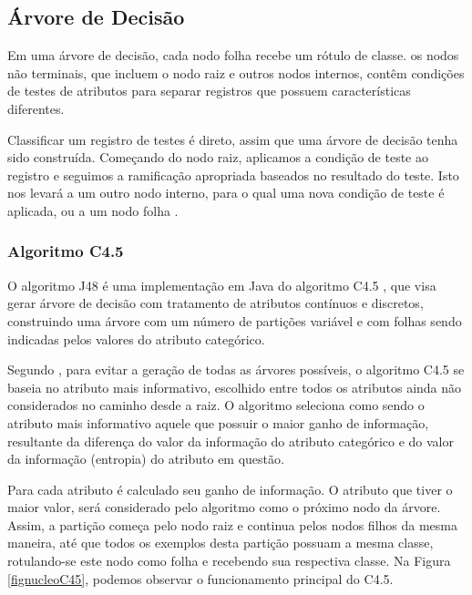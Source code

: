 \documentclass[
	12pt,				%
	openright,			%
	oneside,	
	a4paper,				%
	english,				%
	brazil				%
]{abntex2/abntex2} %
\begin{document}
	\subsection{Árvore de Decisão}
	
		Em uma árvore de decisão, cada nodo folha recebe um rótulo de classe. os nodos não terminais, que incluem o nodo raiz e outros nodos internos, contêm condições de testes de atributos para separar registros que possuem características diferentes.
		
		Classificar um registro de testes é direto, assim que uma árvore de decisão tenha sido construída. Começando do nodo raiz, aplicamos a condição de teste ao registro e seguimos a ramificação apropriada baseados no resultado do teste. Isto nos levará a um outro nodo interno, para o qual uma nova condição de teste é aplicada, ou a um nodo folha \cite{tan:2009}.
	
	\subsubsection{Algoritmo C4.5}
	
	O algoritmo J48 \cite{weka:2015} é uma implementação em Java \cite{oracle:2015} do algoritmo C4.5 \cite{quinlan:94}, que visa gerar árvore de decisão com tratamento de atributos contínuos e discretos, construindo uma árvore com um número de partições variável e com folhas sendo indicadas pelos valores do atributo categórico. 
	
	Segundo \cite{halmenschlager:2002}, para evitar a geração de todas as árvores possíveis, o algoritmo C4.5 se baseia no atributo mais informativo, escolhido entre todos os atributos ainda não considerados no caminho desde a raiz. O algoritmo seleciona como sendo o atributo mais informativo aquele que possuir o maior ganho de informação, resultante da diferença do valor da informação do atributo categórico e do valor da informação (entropia) do atributo em questão.
	
	Para cada atributo é calculado seu ganho de informação. O atributo que tiver o maior valor, será considerado pelo algoritmo como o próximo nodo da árvore. Assim, a partição começa pelo nodo raiz e continua pelos nodos filhos da mesma maneira, até que todos os exemplos desta partição possuam a mesma classe, rotulando-se este nodo como folha e recebendo sua respectiva classe. Na Figura \ref{fignucleoC45}, podemos observar o funcionamento principal do C4.5.
	
\end{document}
